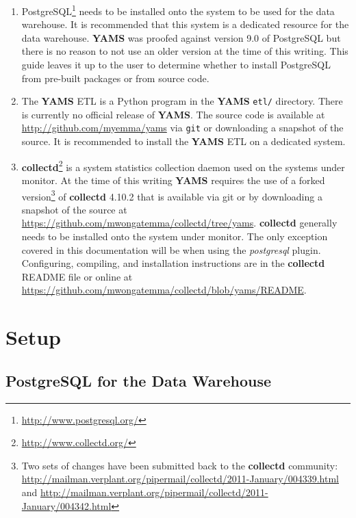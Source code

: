 \documentclass[a4paper,twoside,12pt]{article}
\begin{document}
\begin{enumerate}
  \item PostgreSQL\footnote{\url{http://www.postgresql.org/}} needs to be
        installed onto the system to be used for the data warehouse.  It is
        recommended that this system is a dedicated resource for the data
        warehouse.  \textbf{YAMS} was proofed against version 9.0 of PostgreSQL
        but there is no reason to not use an older version at the time of this
        writing.  This guide leaves it up to the user to determine whether to
        install PostgreSQL from pre-built packages or from source code.
  \item The \textbf{YAMS} ETL is a Python program in the \textbf{YAMS}
        \texttt{etl/} directory.  There is currently no official release of
        \textbf{YAMS}.  The source code is available at
        \url{http://github.com/myemma/yams} via \texttt{git} or downloading a
        snapshot of the source.  It is recommended to install the \textbf{YAMS}
        ETL on a dedicated system.
  \item \textbf{collectd}\footnote{\url{http://www.collectd.org/}} is a system
        statistics collection daemon used on the systems under monitor.  At the
        time of this writing \textbf{YAMS} requires the use of a forked
        version\footnote{Two sets of changes have been submitted back to the
        \textbf{collectd} community:
        \url{http://mailman.verplant.org/pipermail/collectd/2011-January/004339.html}
        and
        \url{http://mailman.verplant.org/pipermail/collectd/2011-January/004342.html}}
        of \textbf{collectd} 4.10.2 that is available via git or by downloading
        a snapshot of the source at
        \url{https://github.com/mwongatemma/collectd/tree/yams}.
        \textbf{collectd} generally needs to be installed onto the system under
        monitor.  The only exception covered in this documentation will be when
        using the \textit{postgresql} plugin.  Configuring, compiling, and
        installation instructions are in the \textbf{collectd} README file or
        online at
        \url{https://github.com/mwongatemma/collectd/blob/yams/README}.

\end{enumerate}

\section{Setup}

\subsection{PostgreSQL for the Data Warehouse}
\end{document}
